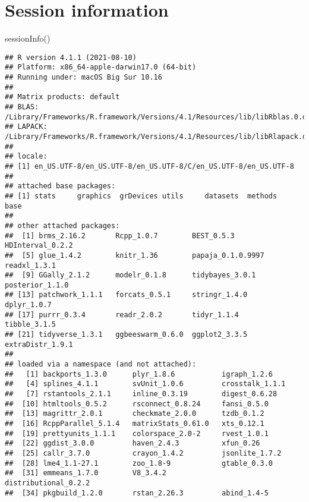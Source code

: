 \documentclass[
  11pt,
  english,
  ,doc,mask,floatsintext]{apa6}
\newenvironment{Shaded}{}{}
\newcommand{\FunctionTok}[1]{\textcolor[rgb]{0.02,0.16,0.49}{#1}}
\newcommand{\NormalTok}[1]{#1}
\begin{document}
\newpage

\hypertarget{session-information}{%
\section{Session information}\label{session-information}}

\begin{Shaded}
\begin{Highlighting}[]
\FunctionTok{sessionInfo}\NormalTok{()}
\end{Highlighting}
\end{Shaded}

\begin{verbatim}
## R version 4.1.1 (2021-08-10)
## Platform: x86_64-apple-darwin17.0 (64-bit)
## Running under: macOS Big Sur 10.16
## 
## Matrix products: default
## BLAS:   /Library/Frameworks/R.framework/Versions/4.1/Resources/lib/libRblas.0.dylib
## LAPACK: /Library/Frameworks/R.framework/Versions/4.1/Resources/lib/libRlapack.dylib
## 
## locale:
## [1] en_US.UTF-8/en_US.UTF-8/en_US.UTF-8/C/en_US.UTF-8/en_US.UTF-8
## 
## attached base packages:
## [1] stats     graphics  grDevices utils     datasets  methods   base     
## 
## other attached packages:
##  [1] brms_2.16.2       Rcpp_1.0.7        BEST_0.5.3        HDInterval_0.2.2 
##  [5] glue_1.4.2        knitr_1.36        papaja_0.1.0.9997 readxl_1.3.1     
##  [9] GGally_2.1.2      modelr_0.1.8      tidybayes_3.0.1   posterior_1.1.0  
## [13] patchwork_1.1.1   forcats_0.5.1     stringr_1.4.0     dplyr_1.0.7      
## [17] purrr_0.3.4       readr_2.0.2       tidyr_1.1.4       tibble_3.1.5     
## [21] tidyverse_1.3.1   ggbeeswarm_0.6.0  ggplot2_3.3.5     extraDistr_1.9.1 
## 
## loaded via a namespace (and not attached):
##   [1] backports_1.3.0      plyr_1.8.6           igraph_1.2.6        
##   [4] splines_4.1.1        svUnit_1.0.6         crosstalk_1.1.1     
##   [7] rstantools_2.1.1     inline_0.3.19        digest_0.6.28       
##  [10] htmltools_0.5.2      rsconnect_0.8.24     fansi_0.5.0         
##  [13] magrittr_2.0.1       checkmate_2.0.0      tzdb_0.1.2          
##  [16] RcppParallel_5.1.4   matrixStats_0.61.0   xts_0.12.1          
##  [19] prettyunits_1.1.1    colorspace_2.0-2     rvest_1.0.1         
##  [22] ggdist_3.0.0         haven_2.4.3          xfun_0.26           
##  [25] callr_3.7.0          crayon_1.4.2         jsonlite_1.7.2      
##  [28] lme4_1.1-27.1        zoo_1.8-9            gtable_0.3.0        
##  [31] emmeans_1.7.0        V8_3.4.2             distributional_0.2.2
##  [34] pkgbuild_1.2.0       rstan_2.26.3         abind_1.4-5         

\end{verbatim}
\end{document}
